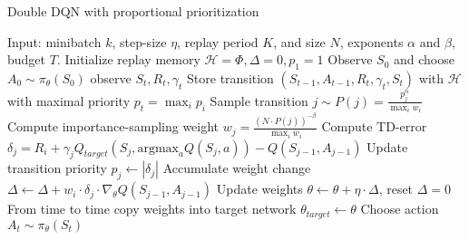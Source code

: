 \documentclass[12pt,a4paper]{article}
\begin{document}
\newpage
\begin{algorithm}
\caption{Double DQN with proportional prioritization}
\begin{algorithmic}
	\State Input: minibatch $k$, step-size $\eta$, replay period $K$, and size $N$, exponents $\alpha$ and $\beta$, budget $T$.
	\State Initialize replay memory $\mathcal{H} = \Phi, \Delta = 0, p_{1}=1$
	\State Observe $S_{0}$ and choose $A_{0} \sim \pi_{\theta}(S_{0})$
		\State observe $S_{t}, R_{t}, \gamma_{t}$
		\State Store transition $(S_{t-1}, A_{t-1}, R_{t}, \gamma_{t}, S_{t})$ with $\mathcal{H}$ with maximal priority $p_{t} = \max_{i}p_{i}$
				\State Sample transition $j \sim P(j) = \frac{p_{j}^{\alpha}}{\max_{i}w_{i}}$
				\State Compute importance-sampling weight $w_{j} = \frac{(N \cdot P(j))^{-\beta}}{\max_{i}w_{i}}$
				\State Compute TD-error $\delta_{j} = R_{i} +\gamma_{j}Q_{target}(S_{j}, \text{argmax}_{a}Q(S_{j}, a)) - Q(S_{j-1}, A_{j-1})$
				\State Update transition priority $p_{j} \leftarrow |\delta_{j}|$
				\State Accumulate weight change $\Delta \leftarrow \Delta + w_{i}\cdot\delta_{j}\cdot\nabla_{\theta}Q(S_{j-1}, A_{j-1})$
			\EndFor
			\State Update weights $\theta \leftarrow \theta + \eta \cdot \Delta$, reset $\Delta = 0$
			\State From time to time copy weights into target network $\theta_{target}\leftarrow \theta$
		\EndIf
		\State Choose action $A_{t} \sim \pi_{\theta}(S_{t})$
	\EndFor
\end{algorithmic}
\end{algorithm}
\end{document}
